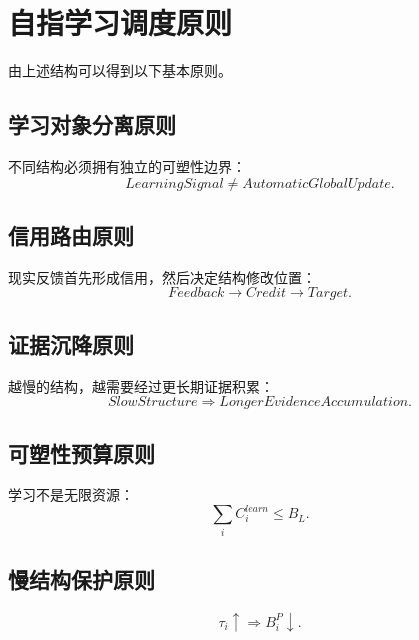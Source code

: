 \section{自指学习调度原则}

由上述结构可以得到以下基本原则。

\subsection{学习对象分离原则}

不同结构必须拥有独立的可塑性边界：
\begin{equation}
\boxed{
LearningSignal
\neq
AutomaticGlobalUpdate.
}
\end{equation}

\subsection{信用路由原则}

现实反馈首先形成信用，然后决定结构修改位置：
\begin{equation}
\boxed{
Feedback
\rightarrow
Credit
\rightarrow
Target.
}
\end{equation}

\subsection{证据沉降原则}

越慢的结构，越需要经过更长期证据积累：
\begin{equation}
\boxed{
SlowStructure
\Rightarrow
LongerEvidenceAccumulation.
}
\end{equation}

\subsection{可塑性预算原则}

学习不是无限资源：
\begin{equation}
\boxed{
\sum_i C_i^{learn}
\leq
B_L.
}
\end{equation}

\subsection{慢结构保护原则}

\begin{equation}
\boxed{
\tau_i\uparrow
\Rightarrow
B_i^P\downarrow.
}
\end{equation}

